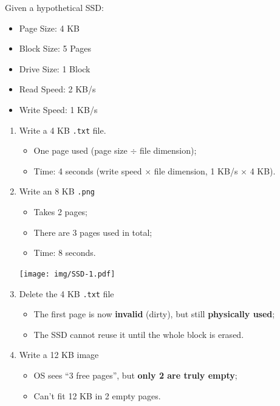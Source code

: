 \begin{examplebox}
    Given a hypothetical SSD:
    \begin{itemize}
        \item Page Size: 4 KB
        \item Block Size: 5 Pages
        \item Drive Size: 1 Block
        \item Read Speed: 2 KB/s
        \item Write Speed: 1 KB/s
    \end{itemize}
    \begin{enumerate}
        \item Write a 4 KB \texttt{.txt} file.
        \begin{itemize}
            \item One page used (page size $\div$ file dimension);
            \item Time: 4 seconds (write speed $\times$ file dimension, 1 KB/s $\times$ 4 KB).
        \end{itemize}

        \item Write an 8 KB \texttt{.png}
        \begin{itemize}
            \item Takes 2 pages;
            \item There are 3 pages used in total;
            \item Time: 8 seconds.
        \end{itemize}
        \begin{center}
            \texttt{[image: img/SSD-1.pdf]}
        \end{center}

        \item Delete the 4 KB \texttt{.txt} file
        \begin{itemize}
            \item The first page is now \textbf{invalid} (dirty), but still \textbf{physically used};
            \item The SSD cannot reuse it until the whole block is erased.
        \end{itemize}

        \item Write a 12 KB image
        \begin{itemize}
            \item OS sees ``3 free pages'', but \textbf{only 2 are truly empty};
            \item Can't fit 12 KB in 2 empty pages.
        \end{itemize}


\end{enumerate}
\end{examplebox}
